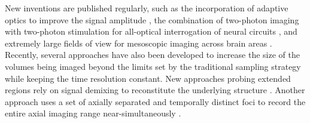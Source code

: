 \documentclass[10pt,letterpaper]{article}
\begin{document}
{New inventions are published regularly, such as the incorporation of adaptive optics to improve the signal amplitude \cite{Yao2023}, the combination of two-photon imaging with two-photon stimulation for all-optical interrogation of neural circuits \cite{Nikolenko2008, Packer2012,Rickgauer2014}, and extremely large fields of view for mesoscopic imaging across brain areas \cite{Sofroniew2016}.  Recently, several approaches have also been developed to increase the size of the volumes being imaged beyond the limits set by the traditional sampling strategy while keeping the time resolution constant. New approaches probing extended regions rely on signal demixing to reconstitute the underlying structure \cite{Song2017, Kazemipour2019}. Another approach uses a set of axially separated and temporally distinct foci to record the entire axial imaging range near-simultaneously \cite{Demas2021}. }
\end{document}
